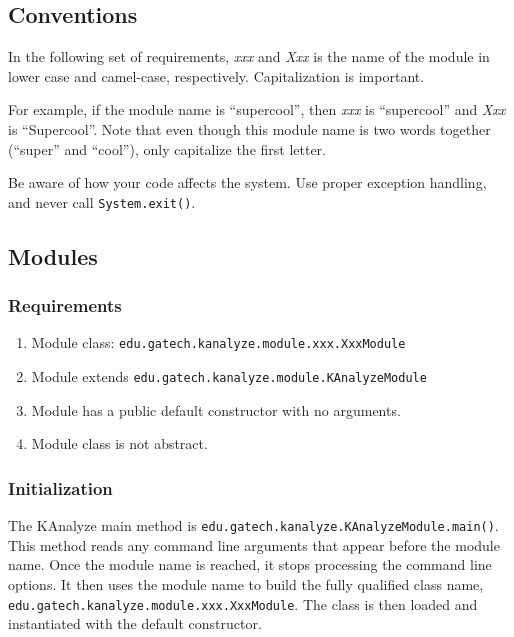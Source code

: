 \subsection{Conventions}
\label{sec.ext.conventions}

In the following set of requirements, \emph{xxx} and \emph{Xxx} is the name of the module in lower case and camel-case, respectively. Capitalization is important.

For example, if the module name is ``supercool'', then \emph{xxx} is ``supercool'' and \emph{Xxx} is ``Supercool''. Note that even though this module name is two words together (``super'' and ``cool''), only capitalize the first letter.

Be aware of how your code affects the system. Use proper exception handling, and never call \texttt{System.exit()}.


\subsection{Modules}
\label{sec.ext.mod}

\subsubsection{Requirements}
\label{sec.ext.mod.requirements}

\begin{enumerate}
  \item Module class: \texttt{edu.gatech.kanalyze.module.xxx.XxxModule}\
  \item Module extends \texttt{edu.gatech.kanalyze.module.KAnalyzeModule}
  \item Module has a public default constructor with no arguments.
  \item Module class is not abstract.
\end{enumerate}

\subsubsection{Initialization}
\label{sec.ext.mod.init}

The KAnalyze main method is \texttt{edu.gatech.kanalyze.KAnalyzeModule.main()}. This method reads any command line arguments that appear before the module name. Once the module name is reached, it stops processing the command line options. It then uses the module name to build the fully qualified class name, \texttt{edu.gatech.kanalyze.module.xxx.XxxModule}. The class is then loaded and instantiated with the default constructor.

